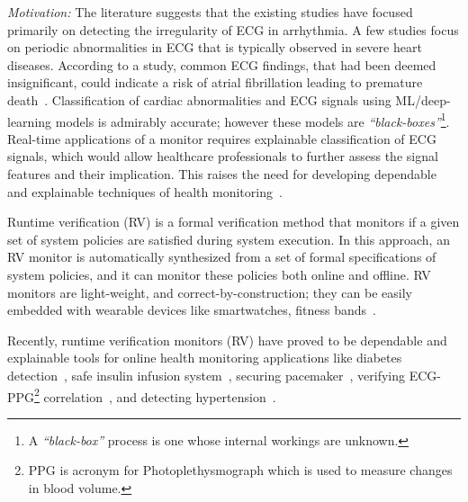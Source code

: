 \textit{Motivation:} The literature suggests that the existing studies have focused primarily on detecting the irregularity of ECG in arrhythmia. A few studies focus on periodic abnormalities in ECG that is typically observed in severe heart diseases. According to a study,
common ECG findings, that had been deemed insignificant, could indicate a risk of atrial fibrillation leading to premature death~\cite{TheHarvardGazette}. Classification of cardiac abnormalities and ECG signals using ML/deep-learning models is admirably accurate; however these models are \emph{``black-boxes''}\footnote{A \textit{``black-box''} process is one whose internal workings are unknown.}. Real-time applications of a monitor requires explainable classification of ECG signals, which would allow healthcare professionals to further assess the signal features and their implication. This raises the need for developing dependable and explainable techniques of health monitoring~\cite{reyes2020interpretability,gastounioti2020time}.

Runtime verification (RV) is a formal verification method that monitors if a given set of system policies are satisfied during system execution. In this approach, an RV monitor is automatically synthesized from a set of formal specifications of system policies, and it can monitor these policies both online and offline. RV monitors are light-weight, and correct-by-construction; they can be easily embedded with wearable devices like smartwatches, fitness bands~\etc.

Recently, runtime verification monitors (RV) have proved to be dependable and explainable tools for online health monitoring applications like diabetes detection~\cite{panda2022policy}, safe insulin infusion system~\cite{panda2021secure}, securing pacemaker~\cite{panda2021runtime}, verifying ECG-PPG\footnote{PPG is acronym for Photoplethysmograph which is used to measure changes in blood volume.} correlation~\cite{panda2022policy}, and detecting hypertension~\cite{DBLP:journals/esl/PandaAPR24}.%




